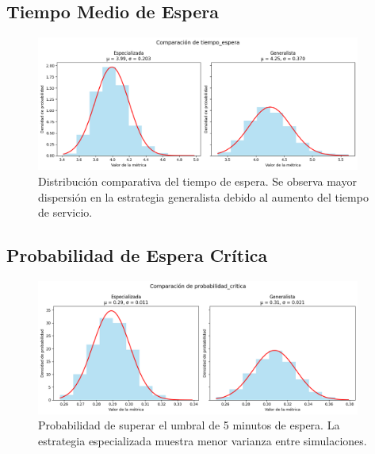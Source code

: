 \documentclass[letterpaper, 12pt]{report}
\begin{document}
\subsection{Tiempo Medio de Espera}
\begin{figure}[H]
    \centering
    \includegraphics[width=0.95\textwidth]{images/wait_time.png}
    \caption{Distribución comparativa del tiempo de espera. Se observa mayor dispersión en la estrategia generalista debido al aumento del tiempo de servicio.}
    \label{fig:espera}
\end{figure}

\subsection{Probabilidad de Espera Crítica}
\begin{figure}[H]
    \centering
    \includegraphics[width=0.95\textwidth]{images/p_over_tk.png}
    \caption{Probabilidad de superar el umbral de 5 minutos de espera. La estrategia especializada muestra menor varianza entre simulaciones.}
    \label{fig:probabilidad}
\end{figure}
\end{document}
